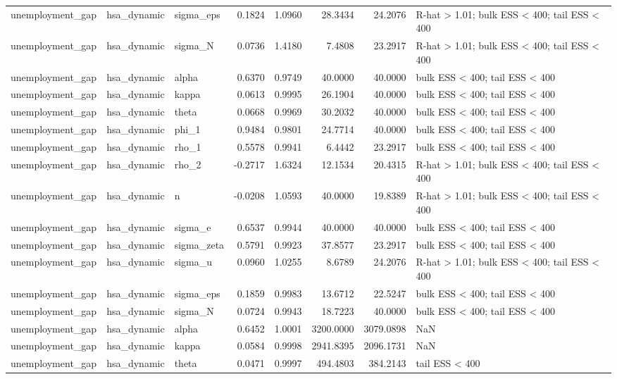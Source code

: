 \begin{tabular}{lllrrrrl}
unemployment\_gap & hsa\_dynamic & sigma\_eps & 0.1824 & 1.0960 & 28.3434 & 24.2076 & R-hat > 1.01; bulk ESS < 400; tail ESS < 400 \\
unemployment\_gap & hsa\_dynamic & sigma\_N & 0.0736 & 1.4180 & 7.4808 & 23.2917 & R-hat > 1.01; bulk ESS < 400; tail ESS < 400 \\
unemployment\_gap & hsa\_dynamic & alpha & 0.6370 & 0.9749 & 40.0000 & 40.0000 & bulk ESS < 400; tail ESS < 400 \\
unemployment\_gap & hsa\_dynamic & kappa & 0.0613 & 0.9995 & 26.1904 & 40.0000 & bulk ESS < 400; tail ESS < 400 \\
unemployment\_gap & hsa\_dynamic & theta & 0.0668 & 0.9969 & 30.2032 & 40.0000 & bulk ESS < 400; tail ESS < 400 \\
unemployment\_gap & hsa\_dynamic & phi\_1 & 0.9484 & 0.9801 & 24.7714 & 40.0000 & bulk ESS < 400; tail ESS < 400 \\
unemployment\_gap & hsa\_dynamic & rho\_1 & 0.5578 & 0.9941 & 6.4442 & 23.2917 & bulk ESS < 400; tail ESS < 400 \\
unemployment\_gap & hsa\_dynamic & rho\_2 & -0.2717 & 1.6324 & 12.1534 & 20.4315 & R-hat > 1.01; bulk ESS < 400; tail ESS < 400 \\
unemployment\_gap & hsa\_dynamic & n & -0.0208 & 1.0593 & 40.0000 & 19.8389 & R-hat > 1.01; bulk ESS < 400; tail ESS < 400 \\
unemployment\_gap & hsa\_dynamic & sigma\_e & 0.6537 & 0.9944 & 40.0000 & 40.0000 & bulk ESS < 400; tail ESS < 400 \\
unemployment\_gap & hsa\_dynamic & sigma\_zeta & 0.5791 & 0.9923 & 37.8577 & 23.2917 & bulk ESS < 400; tail ESS < 400 \\
unemployment\_gap & hsa\_dynamic & sigma\_u & 0.0960 & 1.0255 & 8.6789 & 24.2076 & R-hat > 1.01; bulk ESS < 400; tail ESS < 400 \\
unemployment\_gap & hsa\_dynamic & sigma\_eps & 0.1859 & 0.9983 & 13.6712 & 22.5247 & bulk ESS < 400; tail ESS < 400 \\
unemployment\_gap & hsa\_dynamic & sigma\_N & 0.0724 & 0.9943 & 18.7223 & 40.0000 & bulk ESS < 400; tail ESS < 400 \\
unemployment\_gap & hsa\_dynamic & alpha & 0.6452 & 1.0001 & 3200.0000 & 3079.0898 & NaN \\
unemployment\_gap & hsa\_dynamic & kappa & 0.0584 & 0.9998 & 2941.8395 & 2096.1731 & NaN \\
unemployment\_gap & hsa\_dynamic & theta & 0.0471 & 0.9997 & 494.4803 & 384.2143 & tail ESS < 400 \\

\end{tabular}
